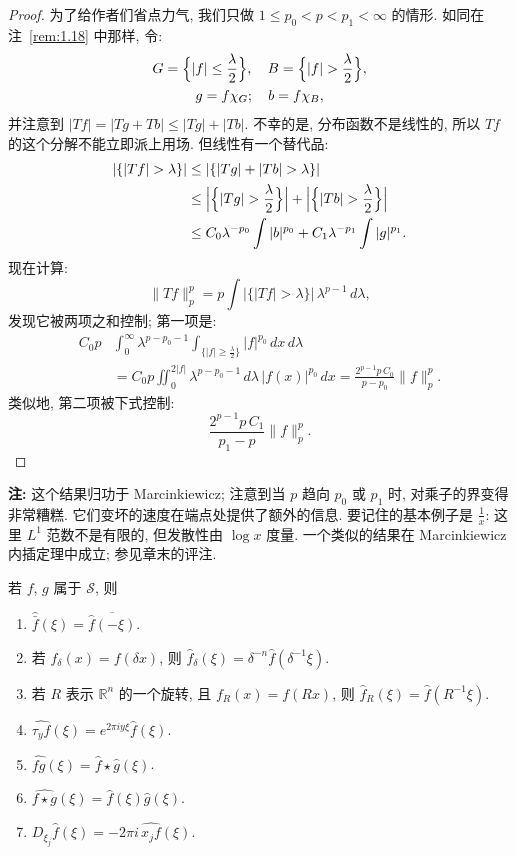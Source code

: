 \begin{proof}
为了给作者们省点力气, 我们只做 $1\leq p_0<p<p_1<\infty$ 的情形. 如同在注~\ref{rem:1.18} 中那样, 令:
\begin{gather*}
G=\Bigl\{|f|\leq\frac{\lambda}{2}\Bigr\},\quad B=\Bigl\{|f|>\frac{\lambda}{2}\Bigr\}, \\
g=f\chi_G;\quad b=f\chi_B,
\end{gather*}
并注意到 $|Tf|=|Tg+Tb|\leq|Tg|+|Tb|$. 不幸的是, 分布函数不是线性的, 所以 $Tf$ 的这个分解不能立即派上用场. 但线性有一个替代品:
\begin{align*}
|\{|Tf|>\lambda\}|&\leq|\{|Tg|+|Tb|>\lambda\}| \\
&\leq\Bigl|\Bigl\{|Tg|>\frac{\lambda}{2}\Bigr\}\Bigr|+\Bigl|\Bigl\{|Tb|>\frac{\lambda}{2}\Bigr\}\Bigr| \\
&\leq C_0\lambda^{-p_0}\int|b|^{p_0}+C_1\lambda^{-p_1}\int|g|^{p_1}.
\end{align*}
现在计算:
\[
\|Tf\|_p^p=p\int|\{|Tf|>\lambda\}|\,\lambda^{p-1}\,d\lambda,
\]
发现它被两项之和控制; 第一项是:
\begin{align*}
C_0p&\int_0^{\infty}\lambda^{p-p_0-1}\int_{\{|f|\geq\frac{\lambda}{2}\}}|f|^{p_0}\,dx\,d\lambda \\
&=C_0p\iint_0^{2|f|}\lambda^{p-p_0-1}\,d\lambda\,|f(x)|^{p_0}\,dx
=\frac{2^{p-1}p\,C_0}{p-p_0}\|f\|_p^p.
\end{align*}
类似地, 第二项被下式控制:
\[
\frac{2^{p-1}p\,C_1}{p_1-p}\|f\|_p^p.
\]
\end{proof}

\noindent\textbf{注:} 这个结果归功于 Marcinkiewicz; 注意到当 $p$ 趋向 $p_0$ 或 $p_1$ 时, 对乘子的界变得非常糟糕. 它们变坏的速度在端点处提供了额外的信息. 要记住的基本例子是 $\frac{1}{x}$: 这里 $L^1$ 范数不是有限的, 但发散性由 $\log x$ 度量. 一个类似的结果在 Marcinkiewicz 内插定理中成立; 参见章末的评注.

\begin{lemma}\label{lem:1.22}
若 $f$, $g$ 属于 $\mathcal{S}$, 则
\begin{enumerate}[label=\alph*)]
\item $\widehat{\bar{f}}(\xi)=\overline{\hat{f}(-\xi)}$.
\item 若 $f_{\delta}(x)=f(\delta x)$, 则 $\hat{f}_{\delta}(\xi)=\delta^{-n}\hat{f}(\delta^{-1}\xi)$.
\item 若 $R$ 表示 $\mathbb{R}^n$ 的一个旋转, 且 $f_R(x)=f(Rx)$, 则 $\hat{f}_R(\xi)=\hat{f}(R^{-1}\xi)$.
\item $\widehat{\tau_y f}(\xi)=e^{2\pi iy\xi}\hat{f}(\xi)$.
\item $\widehat{fg}(\xi)=\hat{f}\star\hat{g}(\xi)$.
\item $\widehat{f\star g}(\xi)=\hat{f}(\xi)\hat{g}(\xi)$.
\item $D_{\xi_j}\hat{f}(\xi)=-2\pi i\,\widehat{x_j f}(\xi)$.
\end{enumerate}
\end{lemma}

